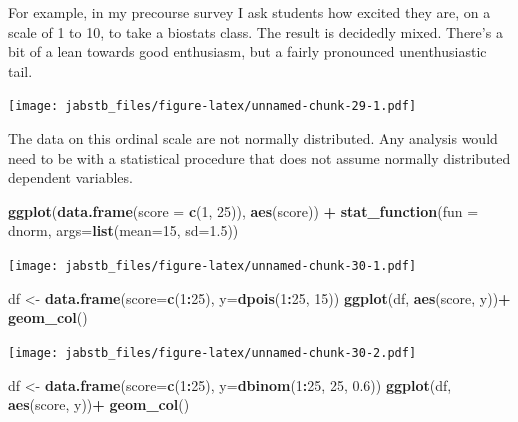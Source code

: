 \documentclass[]{book}
\newenvironment{Shaded}{\begin{snugshade}}{\end{snugshade}}
\newcommand{\DataTypeTok}[1]{\textcolor[rgb]{0.13,0.29,0.53}{#1}}
\newcommand{\DecValTok}[1]{\textcolor[rgb]{0.00,0.00,0.81}{#1}}
\newcommand{\FloatTok}[1]{\textcolor[rgb]{0.00,0.00,0.81}{#1}}
\newcommand{\KeywordTok}[1]{\textcolor[rgb]{0.13,0.29,0.53}{\textbf{#1}}}
\newcommand{\NormalTok}[1]{#1}
\newcommand{\OperatorTok}[1]{\textcolor[rgb]{0.81,0.36,0.00}{\textbf{#1}}}
\newcommand{\StringTok}[1]{\textcolor[rgb]{0.31,0.60,0.02}{#1}}
\begin{document}
For example, in my precourse survey I ask students how excited they are, on a scale of 1 to 10, to take a biostats class. The result is decidedly mixed. There's a bit of a lean towards good enthusiasm, but a fairly pronounced unenthusiastic tail.

\texttt{[image: jabstb\_files/figure-latex/unnamed-chunk-29-1.pdf]}

The data on this ordinal scale are not normally distributed. Any analysis would need to be with a statistical procedure that does not assume normally distributed dependent variables.

\begin{Shaded}
\begin{Highlighting}[]
\KeywordTok{ggplot}\NormalTok{(}\KeywordTok{data.frame}\NormalTok{(}\DataTypeTok{score =} \KeywordTok{c}\NormalTok{(}\DecValTok{1}\NormalTok{, }\DecValTok{25}\NormalTok{)), }
       \KeywordTok{aes}\NormalTok{(score)) }\OperatorTok{+}
\StringTok{  }\KeywordTok{stat_function}\NormalTok{(}\DataTypeTok{fun =}\NormalTok{ dnorm, }\DataTypeTok{args=}\KeywordTok{list}\NormalTok{(}\DataTypeTok{mean=}\DecValTok{15}\NormalTok{, }\DataTypeTok{sd=}\FloatTok{1.5}\NormalTok{)) }
\end{Highlighting}
\end{Shaded}

\texttt{[image: jabstb\_files/figure-latex/unnamed-chunk-30-1.pdf]}

\begin{Shaded}
\begin{Highlighting}[]
\NormalTok{df <-}\StringTok{ }\KeywordTok{data.frame}\NormalTok{(}\DataTypeTok{score=}\KeywordTok{c}\NormalTok{(}\DecValTok{1}\OperatorTok{:}\DecValTok{25}\NormalTok{), }\DataTypeTok{y=}\KeywordTok{dpois}\NormalTok{(}\DecValTok{1}\OperatorTok{:}\DecValTok{25}\NormalTok{, }\DecValTok{15}\NormalTok{))}
\KeywordTok{ggplot}\NormalTok{(df, }\KeywordTok{aes}\NormalTok{(score, y))}\OperatorTok{+}
\StringTok{       }\KeywordTok{geom_col}\NormalTok{()}
\end{Highlighting}
\end{Shaded}

\texttt{[image: jabstb\_files/figure-latex/unnamed-chunk-30-2.pdf]}

\begin{Shaded}
\begin{Highlighting}[]
\NormalTok{df <-}\StringTok{ }\KeywordTok{data.frame}\NormalTok{(}\DataTypeTok{score=}\KeywordTok{c}\NormalTok{(}\DecValTok{1}\OperatorTok{:}\DecValTok{25}\NormalTok{), }\DataTypeTok{y=}\KeywordTok{dbinom}\NormalTok{(}\DecValTok{1}\OperatorTok{:}\DecValTok{25}\NormalTok{, }\DecValTok{25}\NormalTok{, }\FloatTok{0.6}\NormalTok{))}
\KeywordTok{ggplot}\NormalTok{(df, }\KeywordTok{aes}\NormalTok{(score, y))}\OperatorTok{+}
\StringTok{       }\KeywordTok{geom_col}\NormalTok{()}
\end{Highlighting}
\end{Shaded}
\end{document}
